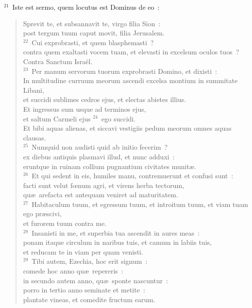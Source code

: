 ${}^{21}$~Iste est sermo, quem locutus est Dominus de eo~: \begin{flushleft}\begin{verse}Sprevit te, et subsannavit te, virgo filia Sion~:\\ post tergum tuum caput movit, filia Jerusalem.\\
${}^{22}$~Cui exprobrasti, et quem blasphemasti~?\\ contra quem exaltasti vocem tuam, et elevasti in excelsum oculos tuos~?\\ Contra Sanctum Isra\"el.\\
${}^{23}$~Per manum servorum tuorum exprobrasti Domino, et dixisti~:\\ In multitudine curruum meorum ascendi excelsa montium in summitate Libani,\\ et succidi sublimes cedros ejus, et electas abietes illius.\\ Et ingressus sum usque ad terminos ejus,\\ et saltum Carmeli ejus
${}^{24}$~ego succidi.\\ Et bibi aquas alienas, et siccavi vestigiis pedum meorum omnes aquas clausas.\\
${}^{25}$~Numquid non audisti quid ab initio fecerim~?\\ ex diebus antiquis plasmavi illud, et nunc adduxi~:\\ eruntque in ruinam collium pugnantium civitates munit\ae .\\
${}^{26}$~Et qui sedent in eis, humiles manu, contremuerunt et confusi sunt~:\\ facti sunt velut fœnum agri, et virens herba tectorum,\\ qu\ae\ arefacta est antequam veniret ad maturitatem.\\
${}^{27}$~Habitaculum tuum, et egressum tuum, et introitum tuum, et viam tuam ego pr\ae scivi,\\ et furorem tuum contra me.\\
${}^{28}$~Insanisti in me, et superbia tua ascendit in aures meas~:\\ ponam itaque circulum in naribus tuis, et camum in labiis tuis,\\ et reducam te in viam per quam venisti.\\
${}^{29}$~Tibi autem, Ezechia, hoc erit signum~:\\ comede hoc anno qu\ae\ repereris~:\\ in secundo autem anno, qu\ae\ sponte nascuntur~:\\ porro in tertio anno seminate et metite~:\\ plantate vineas, et comedite fructum earum.\\

\end{verse}
\end{flushleft}
